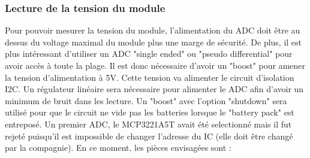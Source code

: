 				\subsubsection{Lecture de la tension du module}
					Pour pouvoir mesurer la tension du module, l'alimentation du ADC doit \^{e}tre au dessus du voltage maximal du module plus une marge de s\'{e}curit\'{e}. De plus, il est plus int\'{e}ressant d'utiliser un ADC "single ended" ou "pseudo differential" pour avoir acc\`{e}s \`{a} toute la plage. Il est donc n\'{e}cessaire d'avoir un "boost" pour amener la tension d'alimentation \`{a} 5V. Cette tension va alimenter le circuit d'isolation I2C. Un r\'{e}gulateur lin\'{e}aire sera n\'{e}cessaire pour alimenter le ADC afin d'avoir un minimum de bruit dans les lecture. Un "boost" avec l'option "shutdown" sera utilis\'{e} pour que le circuit ne vide pas les batteries lorsque le "battery pack" est entrepos\'{e}. Un premier ADC, le MCP3221A5T avait \'{e}t\'{e} selectionn\'{e} mais il fut rejet\'{e} puisqu'il est impossible de changer l'adresse du IC (elle doit \^{e}tre chang\'{e} par la compagnie). En ce moment, les pi\`{e}ces envisag\'{e}es sont :
					
